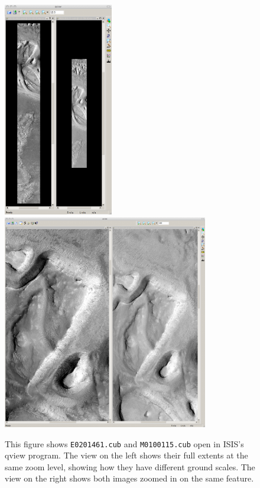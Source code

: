 \begin{figure}[b!]
\begin{minipage}{5.2in}
\includegraphics[height=3.7in]{images/p19-images.png}
\hfill
\includegraphics[height=3.7in]{images/p19-images_zoom.png}
\end{minipage}
\hfill
\begin{minipage}{1.3in}
\caption[P19 images open in qview zoomed in]{
    \label{p19-images}
    This figure shows \texttt{E0201461.cub} and \texttt{M0100115.cub}
    open in ISIS's qview program.  The view on the left shows their
    full extents at the same zoom level, showing how they have
    different ground scales.  The view on the right shows both images
    zoomed in on the same feature.  }
\end{minipage}
\end{figure}

